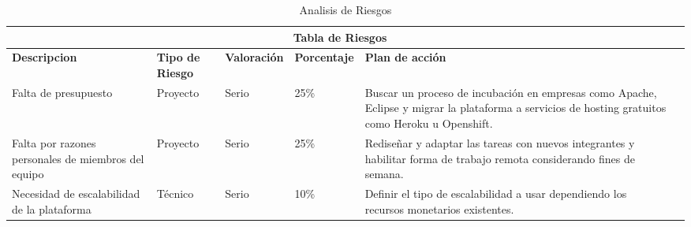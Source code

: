     \begin{table}[b!]
    \centering
      \begin{tabular}{|p{3cm}|lllll}
        \hline
        \multicolumn{5}{|c|}{{\bf Tabla de Riesgos}} \\ 
        \hline
          \multicolumn{1}{|p{3cm}|}{{\bf Descripcion}} & 
          \multicolumn{1}{p{2cm}|}{{\bf Tipo de Riesgo}} & 
          \multicolumn{1}{p{2cm}|}{{\bf Valoración}} & 
          \multicolumn{1}{p{2cm}|}{{\bf Porcentaje}} & 
          \multicolumn{1}{p{5cm}|}{{\bf Plan de acción}} \\ 
        \hline
          \multicolumn{1}{|p{3cm}|}{Falta de presupuesto} & 
          \multicolumn{1}{p{2cm}|}{Proyecto} & 
          \multicolumn{1}{p{2cm}|}{Serio} & 
          \multicolumn{1}{p{2cm}|}{25\%} & 
          \multicolumn{1}{p{5cm}|}{Buscar un proceso de incubación en empresas como Apache, Eclipse y migrar la plataforma a servicios de hosting gratuitos como Heroku u Openshift.} \\ 
        \hline
          \multicolumn{1}{|p{3cm}|}{Falta por razones personales de miembros del equipo} & 
          \multicolumn{1}{p{2cm}|}{Proyecto} &
          \multicolumn{1}{p{2cm}|}{Serio} & 
          \multicolumn{1}{p{2cm}|}{25\%} & 
          \multicolumn{1}{p{5cm}|}{Rediseñar y adaptar las tareas con nuevos integrantes y habilitar forma de trabajo remota considerando fines de semana.} \\ 
        \hline
          \multicolumn{1}{|p{3cm}|}{Necesidad de escalabilidad de la plataforma} & 
          \multicolumn{1}{p{2cm}|}{Técnico} & 
          \multicolumn{1}{p{2cm}|}{Serio} & 
          \multicolumn{1}{p{2cm}|}{10\%} & 
          \multicolumn{1}{p{5cm}|}{Definir el tipo de escalabilidad a usar dependiendo los recursos monetarios existentes.} \\ 
        \hline
      \end{tabular}
      \caption{Analisis de Riesgos}
      \label{Analisis de riesgos}
    \end{table}
    \clearpage